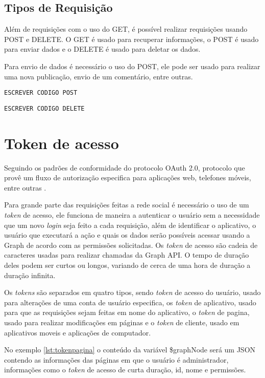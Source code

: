 \subsection{Tipos de Requisição}
Além de requisições com o uso do GET, é possível realizar requisições usando POST e DELETE. O GET é usado para recuperar informações, o POST é usado para enviar dados e o DELETE é usado para deletar os dados.

Para envio de dados é necessário o uso do POST, ele pode ser usado para realizar uma nova publicação, envio de um comentário, entre outras.
\begin{lstlisting}[caption={Requsição de diversos atributos},label={lst:requisicao9}]
ESCREVER CODIGO POST
\end{lstlisting}

\begin{lstlisting}[caption={Requsição de diversos atributos},label={lst:requisicao10}]
ESCREVER CODIGO DELETE
\end{lstlisting}

\section{Token de acesso}
Seguindo os padrões de conformidade do protocolo OAuth 2.0, protocolo que provê um fluxo de autorização especifica para aplicações web, telefones móveis, entre outras \cite{oauth2018}. 

Para grande parte das requisições feitas a rede social é necessário o uso de um \textit{token} de acesso, ele funciona de maneira a autenticar o usuário sem a necessidade que um novo \textit{login} seja feito a cada requisição, além de identificar o aplicativo, o usuário que executará a ação e quais os dados serão possíveis acessar usando a Graph de acordo com as permissões solicitadas. Os \textit{token} de acesso são cadeia de caracteres usadas para realizar chamadas da Graph API. O tempo de duração deles podem ser curtos ou longos, variando de cerca de uma hora de duração a duração infinita.

Os \textit{tokens} são separados em quatro tipos, sendo \textit{token} de acesso do usuário, usado para alterações de uma conta de usuário especifica, os  \textit{token} de aplicativo, usado para que as requisições sejam feitas em nome do aplicativo, o \textit{token} de pagina, usado para realizar modificações em páginas e o \textit{token} de cliente, usado em aplicativos moveis e aplicações de computador.

No exemplo \ref{lst:tokenpagina} o conteúdo da variável \$graphNode será um JSON contendo as informações das páginas em que o usuário é administrador, informações como o \textit{token} de acesso de curta duração, id, nome e permissões. 

